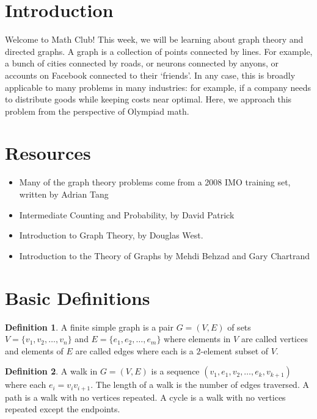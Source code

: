 \documentclass{article}
\theoremstyle{definition}
\newtheorem{definition}{Definition}[section]
\theoremstyle{remark}
\begin{document}
\section{Introduction}
Welcome to Math Club! This week, we will be learning about graph theory and directed graphs. A graph is a collection of points connected by lines. For example, a bunch of cities connected by roads, or neurons connected by anyons, or accounts on Facebook connected to their ‘friends’. In any case, this is broadly applicable to many problems in many industries: for example, if a company needs to distribute goods while keeping costs near optimal. Here, we approach this problem from the perspective of Olympiad math.


\section{Resources}
\begin{itemize}
    \item Many of the graph theory problems come from a 2008 IMO training set, written by Adrian Tang
    
    \item Intermediate Counting and Probability, by David Patrick
    
    \item Introduction to Graph Theory, by Douglas West.
    
    \item Introduction to the Theory of Graphs by Mehdi Behzad and Gary Chartrand
\end{itemize}


\section{Basic Definitions} 
\begin{definition}
A finite simple graph is a pair $G = (V, E)$ of sets $V = \{v_{1}, v_{2}, \ldots, v_{n}\}$ and $E = \{e_{1}, e_{2}, \ldots, e_{m}\}$ where elements in $V$ are called vertices and elements of $E$ are called edges where each is a $2$-element subset of $V$. 
\end{definition}

\begin{definition}
A walk in $G = (V, E)$ is a sequence $(v_{1}, e_{1}, v_{2}, \ldots, e_{k}, v_{k + 1})$ where each $e_{i} = v_{i}v_{i + 1}$. The length of a walk is the number of edges traversed. A path is a walk with no vertices repeated. A cycle is a walk with no vertices repeated except the endpoints.
\end{definition}
\end{document}
